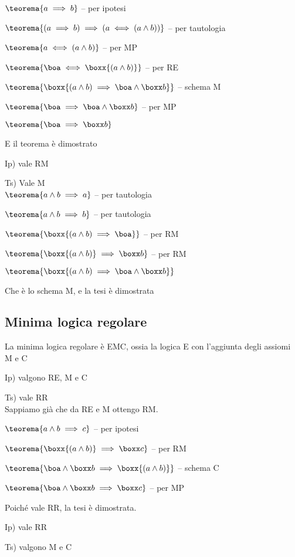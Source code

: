 $\teorema{a\implies b}$ -- per ipotesi

$\teorema{(a\implies b)\implies(a\iff(a\wedge b))}$ -- per tautologia

$\teorema{a\iff(a\wedge b)}$ -- per MP 

$\teorema{\boa\iff\boxx{(a\wedge b)}}$ -- per RE

$\teorema{\boxx{(a\wedge b)\implies\boa\wedge\boxx b}}$ -- schema
M

$\teorema{\boa\implies\boa\wedge\boxx b}$ -- per MP

$\teorema{\boa\implies\boxx b}$

E il teorema è dimostrato

Ip) vale RM

Ts) Vale M\\


$\teorema{a\wedge b\implies a}$ -- per tautologia

$\teorema{a\wedge b\implies b}$ -- per tautologia

$\teorema{\boxx{(a\wedge b)\implies\boa}}$ -- per RM

$\teorema{\boxx{(a\wedge b)}\implies\boxx b}$ -- per RM

$\teorema{\boxx{(a\wedge b)\implies\boa\wedge\boxx b}}$ 

Che è lo schema M, e la tesi è dimostrata


\subsection{Minima logica regolare}

La minima logica regolare è EMC, ossia la logica E con l'aggiunta
degli assiomi M e C

Ip) valgono RE, M e C

Ts) vale RR\\


Sappiamo già che da RE e M ottengo RM.

$\teorema{a\wedge b\implies c}$ -- per ipotesi

$\teorema{\boxx{(a\wedge b)}\implies\boxx c}$ -- per RM

$\teorema{\boa\wedge\boxx b\implies\boxx{(a\wedge b)}}$ -- schema
C

$\teorema{\boa\wedge\boxx b\implies\boxx c}$ -- per MP

Poiché vale RR, la tesi è dimostrata.

Ip) vale RR

Ts) valgono M e C\\


